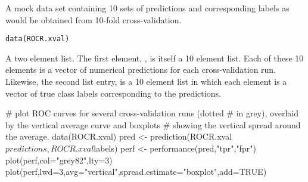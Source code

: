 \begin{Description}\relax
A mock data set containing 10 sets of predictions and
corresponding labels as would be obtained from 10-fold cross-validation.
\end{Description}
\begin{Usage}
\begin{verbatim}data(ROCR.xval)\end{verbatim}
\end{Usage}
\begin{Format}\relax
A two element list. The first element,
, is itself a 10 element list. Each of these 10
elements is a vector of numerical predictions for each cross-validation
run. Likewise, the second list entry,  is a 10
element list in which each element is a vector of true class
labels corresponding to the predictions.
\end{Format}
\begin{Examples}
\begin{ExampleCode}
# plot ROC curves for several cross-validation runs (dotted
# in grey), overlaid by the vertical average curve and boxplots
# showing the vertical spread around the average.
data(ROCR.xval)
pred <- prediction(ROCR.xval$predictions, ROCR.xval$labels)
perf <- performance(pred,"tpr","fpr")
plot(perf,col="grey82",lty=3)
plot(perf,lwd=3,avg="vertical",spread.estimate="boxplot",add=TRUE)
\end{ExampleCode}
\end{Examples}

